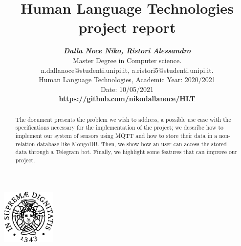 \documentclass[12pt, letterpaper]{article}  %
\title{\vspace{-2cm}\textbf{Human Language Technologies project report}}
\author{\textbf{\small{\textit{Dalla Noce Niko, Ristori Alessandro}}} \\ %
        \small{Master Degree in Computer science.}\\ \small{{n.dallanoce@studenti.unipi.it, a.ristori5@studenti.unipi.it}.} \\  %
        \small{Human Language Technologies, Academic Year: 2020/2021} \\
        \small{Date: 10/05/2021} \\
       \textbf{\small{\url{https://github.com/nikodallanoce/HLT}}}
}
\begin{document}
\nocite{*}  %
\date{}
\maketitle
\begin{center}
    \includegraphics[width=0.2\textwidth]{images/unipi.png}\\
    \vspace{0.5cm}
\end{center}
\begin{abstract}
The document presents the problem we wish to address, a possible use case with the specifications necessary for the implementation of the project; we describe how to implement our system of sensors using MQTT and how to store their data in a non-relation database like MongoDB. Then, we show how an user can access the stored data through a Telegram bot. Finally, we highlight some features that can improve our project.
\end{abstract}
%
\newpage
\tableofcontents
\newpage
\listoffigures

%
%
%

\end{document}
